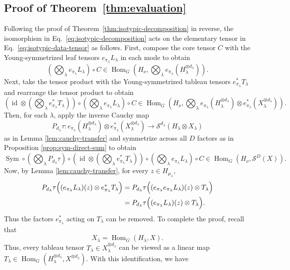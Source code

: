 \documentclass[11pt]{article}
\newcommand{\scS}{\mathcal{S}}
\newcommand{\HomG}[2]{\operatorname{Hom}_G\!\left(#1,#2\right)}
\newcommand{\Sym}{\operatorname{Sym}}
\newcommand{\id}{\operatorname{id}}
\theoremstyle{definition}
\begin{document}
\subsection{Proof of Theorem~\ref{thm:evaluation}}\label{sec:proof-evaluation}
Following the proof of Theorem~\ref{thm:isotypic-decomposition} in reverse, the isomorphism in Eq.~\eqref{eq:isotypic-decomposition} acts on the elementary tensor in Eq.~\eqref{eq:isotypic-data-tensor} as follows. First, compose the core tensor $C$ with the Young-symmetrized leaf tensors $e_{\pi_\lambda} L_\lambda$ in each mode to obtain
\[
  \left(\bigotimes_\lambda e_{\pi_\lambda} L_\lambda\right)
  \circ
  C
  \in \HomG{H_\nu}{\bigotimes_\lambda e_{\pi_\lambda}(H_\lambda^{\otimes d_\lambda})}.
\]
Next, take the tensor product with the Young-symmetrized tableau tensors $e_{\pi_\lambda}^*T_\lambda$ and rearrange the tensor product to obtain
\[
  \left(\id \otimes \left(\bigotimes_\lambda e_{\pi_\lambda}^*T_\lambda\right)\right)
  \circ
  \left(\bigotimes_\lambda e_{\pi_\lambda} L_\lambda\right)
  \circ
  C
  \in \HomG{H_\nu}{\bigotimes_\lambda e_{\pi_\lambda}(H_\lambda^{\otimes d_\lambda})
  \otimes
  e_{\pi_\lambda}^*(X_\lambda^{\otimes d_\lambda})}.
\]
Then, for each $\lambda$, apply the inverse Cauchy map
\[
  P_{d_\lambda}\tau:
  e_{\pi_\lambda}(H_\lambda^{\otimes d_\lambda})\otimes e_{\pi_\lambda}^*(X_\lambda^{\otimes d_\lambda})
  \longrightarrow
  \scS^{d_\lambda}(H_\lambda\otimes X_\lambda)
\]
as in Lemma \ref{lem:cauchy-transfer} and symmetrize across all $D$ factors as in Proposition \ref{prop:sym-direct-sum} to obtain
\[
  \Sym
  \circ
  \left(\bigotimes_\lambda P_{d_\lambda}\tau\right)
  \circ
  \left(\id \otimes \left(\bigotimes_\lambda e_{\pi_\lambda}^*T_\lambda\right)\right)
  \circ
  \left(\bigotimes_\lambda e_{\pi_\lambda} L_\lambda\right)
  \circ
  C
  \in \HomG{H_\nu}{\scS^D(X)}.
\]
Now, by Lemma \ref{lem:cauchy-transfer}, for every $z\in H_{\mu_\lambda}$,
\begin{align*}
  P_{d_\lambda}\tau\Bigl((e_{\pi_\lambda}L_\lambda)(z)\otimes e_{\pi_\lambda}^*T_\lambda\Bigr)
  &=
  P_{d_\lambda}\tau\Bigl((e_{\pi_\lambda}e_{\pi_\lambda}L_\lambda)(z)\otimes T_\lambda\Bigr) \\
  &=
  P_{d_\lambda}\tau\Bigl((e_{\pi_\lambda}L_\lambda)(z)\otimes T_\lambda\Bigr).
\end{align*}
Thus the factors $e_{\pi_\lambda}^*$ acting on $T_\lambda$ can be removed. To complete the proof, recall that
\[
  X_\lambda = \HomG{H_\lambda}{X}.
\]
Thus, every tableau tensor $T_\lambda\in X_\lambda^{\otimes d_\lambda}$ can be viewed as a linear map $T_\lambda \in \HomG{H_\lambda^{\otimes d_\lambda}}{X^{\otimes d_\lambda}}$. With this identification, we have
\end{document}
